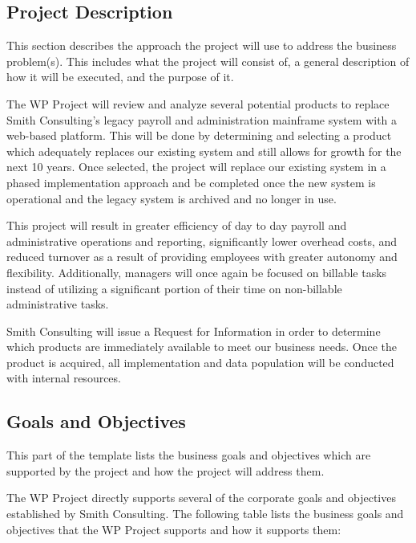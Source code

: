 \documentclass[11pt]{article}
\begin{document}
\subsection{Project Description}
\label{sec:org11749fb}
This section describes the approach the project will use to address the business problem(s). This includes what the project will consist of, a general description of how it will be executed, and the purpose of it.

The WP Project will review and analyze several potential products to replace Smith Consulting’s legacy payroll and administration mainframe system with a web-based platform. This will be done by determining and selecting a product which adequately replaces our existing system and still allows for growth for the next 10 years. Once selected, the project will replace our existing system in a phased implementation approach and be completed once the new system is operational and the legacy system is archived and no longer in use.

This project will result in greater efficiency of day to day payroll and administrative operations and reporting, significantly lower overhead costs, and reduced turnover as a result of providing employees with greater autonomy and flexibility. Additionally, managers will once again be focused on billable tasks instead of utilizing a significant portion of their time on non-billable administrative tasks.

Smith Consulting will issue a Request for Information in order to determine which products are immediately available to meet our business needs. Once the product is acquired, all implementation and data population will be conducted with internal resources.

\subsection{Goals and Objectives}
\label{sec:org1a4cf3f}
This part of the template lists the business goals and objectives which are supported by the project and how the project will address them.

The WP Project directly supports several of the corporate goals and objectives established by Smith Consulting. The following table lists the business goals and objectives that the WP Project supports and how it supports them:
\end{document}
